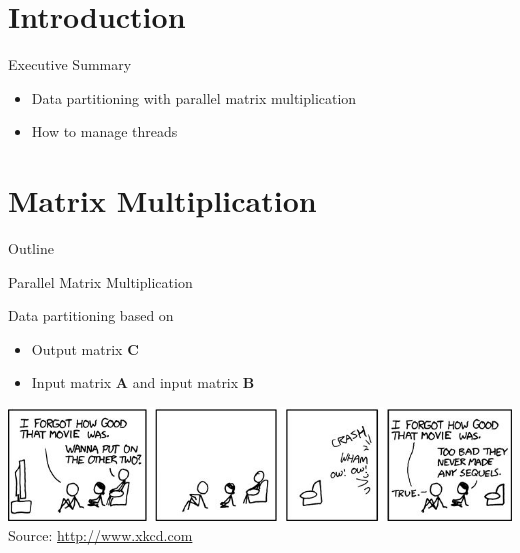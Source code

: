 \section*{Introduction}

\begin{frame}{Executive Summary}
  \begin{itemize}
  \item Data partitioning with parallel matrix multiplication
  \item How to manage threads
  \end{itemize}
\end{frame}


\section{Matrix Multiplication}

\begin{frame}{Outline}
  \tableofcontents[current]
\end{frame}

\begin{frame}{Parallel Matrix Multiplication}
  \begin{block}{Data partitioning based on}
    \begin{itemize}
    \item Output matrix $\mathbf{C}$
    \item Input matrix $\mathbf{A}$ and input matrix $\mathbf{B}$
    \end{itemize}
  \end{block}

  
  \begin{center}
    \includegraphics[scale=0.4]{figures/xkcd-matrix} \\
    \tiny{Source: \url{http://www.xkcd.com}}
  \end{center}
\end{frame}

